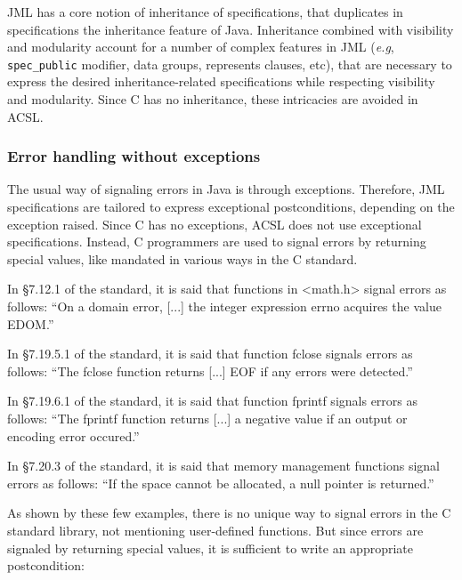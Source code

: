 JML has a core notion of inheritance of specifications, that duplicates
in specifications the inheritance feature of Java.  Inheritance
combined with visibility and modularity account for a number of
complex features in JML (\emph{e.g}, \verb|spec_public| modifier, data
groups, represents clauses, etc), that are necessary to express the
desired inheritance-related specifications while respecting visibility
and modularity. Since C has no inheritance, these intricacies are
avoided in ACSL.

\subsubsection*{Error handling without exceptions}
\label{sec:errorhandling}

The usual way of signaling errors in Java is through
exceptions. Therefore, JML specifications are tailored to express
exceptional postconditions, depending on the exception raised. Since C
has no exceptions, ACSL does not use exceptional
specifications. Instead, C programmers are used to signal errors by
returning special values, like mandated in various ways in the C standard.

\begin{example}
In \S 7.12.1 of the standard, it is said that functions in <math.h>
signal errors as follows:
``On a domain error, [...] the integer expression errno
acquires the value EDOM.''
\end{example}

\begin{example}
In \S 7.19.5.1 of the standard, it is said that function fclose signals
errors as follows:
``The fclose function returns [...] EOF if any errors were detected.''
\end{example}

\begin{example}
In \S 7.19.6.1 of the standard, it is said that function fprintf
signals errors as follows:
``The fprintf function returns [...] a negative value if an output or
encoding error occured.''
\end{example}

\begin{example}
In \S 7.20.3 of the standard, it is said that memory management functions
signal errors as follows:
``If the space cannot be allocated, a null pointer is returned.''
\end{example}

As shown by these few examples, there is no unique way to signal
errors in the C standard library, not mentioning user-defined
functions. But since errors are signaled by returning special values, it
is sufficient to write an appropriate postcondition:

